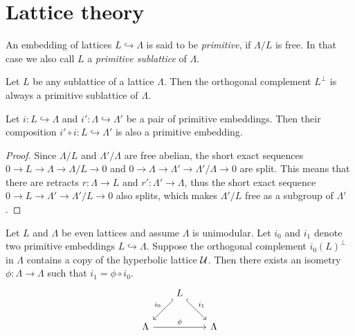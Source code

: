 \section{Lattice theory}

\begin{definition}
    An embedding of lattices $L \hookrightarrow \Lambda$ is said to be \emph{primitive}, if $\Lambda/L$ is free. In that case we also call $L$ a \emph{primitive sublattice} of $\Lambda$.
\end{definition}

\begin{example}
    \label{orthogonal complement primitive}
    Let $L$ be any sublattice of a lattice $\Lambda$. Then the orthogonal complement $L^\perp$ is always a primitive sublattice of $\Lambda$.
\end{example}

\begin{proposition}
    \label{composition of primitive embeddings}
    Let $i \colon L \hookrightarrow \Lambda$ and $i' \colon \Lambda \hookrightarrow \Lambda'$ be a pair of primitive embeddings. Then their composition $i' \circ i \colon L \hookrightarrow \Lambda'$ is also a primitive embedding.
\end{proposition}

\begin{proof}
    Since $\Lambda/L$ and $\Lambda'/\Lambda$ are free abelian, the short exact sequences $0 \to L \to \Lambda \to \Lambda/L \to 0$ and $0 \to \Lambda \to \Lambda' \to \Lambda'/\Lambda \to 0$ are split. This means that there are retracts $r \colon \Lambda \to L$ and $r' \colon \Lambda' \to \Lambda$, thus the short exact sequence $0 \to L \to \Lambda' \to \Lambda'/L \to 0$ also splits, which makes $\Lambda'/L$ free as a subgroup of $\Lambda'$.
\end{proof}

\begin{proposition}
    \label{extending an isometry 1}
    Let $L$ and $\Lambda$ be even lattices and assume $\Lambda$ is unimodular. Let $i_0$ and $i_1$ denote two primitive embeddings $L \hookrightarrow \Lambda$. Suppose the orthogonal complement $i_0(L)^\perp$ in $\Lambda$ contains a copy of the hyperbolic lattice $\mathcal U$. Then there exists an isometry $\phi \colon \Lambda \to \Lambda$ such that $i_1 = \phi \circ i_0$.
    \[\begin{tikzcd}[row sep = 1em, column sep = 2em]
        & L \\
        \\
        \Lambda && \Lambda
        \arrow["{i_0}"', hook', from=1-2, to=3-1]
        \arrow["{i_1}", hook, from=1-2, to=3-3]
        \arrow["\phi", from=3-1, to=3-3]
    \end{tikzcd}\]
\end{proposition}

